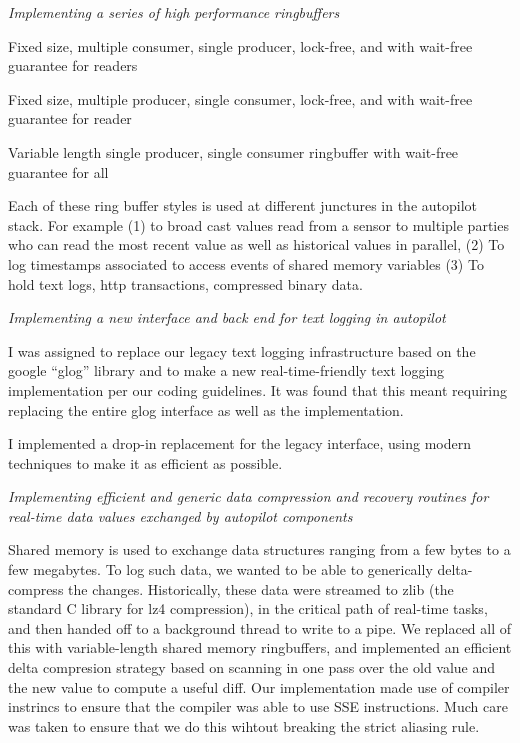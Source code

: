 \documentclass[margin,line]{resume}
\begin{document}
\begin{resume}
    \textsl{Implementing a series of high performance ringbuffers}

    \begin{list2}
    \item{Fixed size, multiple consumer, single producer, lock-free, and with wait-free guarantee for readers}
    \item{Fixed size, multiple producer, single consumer, lock-free, and with wait-free guarantee for reader}
    \item{Variable length single producer, single consumer ringbuffer with wait-free guarantee for all}
    \end{list2}
    
    Each of these ring buffer styles is used at different junctures in the autopilot stack. For example (1) to broad cast values read
    from a sensor to multiple parties who can read the most recent value as well as historical values in parallel,
    (2) To log timestamps associated to access events of shared memory variables (3) To hold text logs, http transactions, compressed
    binary data.
    
    \textsl{Implementing a new interface and back end for text logging in autopilot}
    
    I was assigned to replace our legacy text logging infrastructure based on the google ``glog'' library and
    to make a new real-time-friendly text logging implementation per our coding guidelines.
    It was found that this meant requiring replacing the entire glog interface as well as the implementation.
    
    I implemented a drop-in replacement for the legacy interface, using modern techniques to make it as efficient as possible.

    \textsl{Implementing efficient and generic data compression and recovery routines for real-time data values exchanged by autopilot components}

    Shared memory is used to exchange data structures ranging from a few bytes to a few megabytes. To log such data, we wanted to be able
    to generically delta-compress the changes. Historically, these data were streamed to zlib (the standard C library for lz4 compression),
    in the critical path of real-time tasks, and then handed off to a background thread to write to a pipe. We replaced all of this with variable-length shared memory ringbuffers, and implemented an efficient delta compresion
    strategy based on scanning in one pass over the old value and the new value to compute a useful diff. Our implementation made use of compiler instrincs
    to ensure that the compiler was able to use SSE instructions. Much care was taken to ensure that we do this wihtout
    breaking the strict aliasing rule.


\end{resume}
\end{document}
